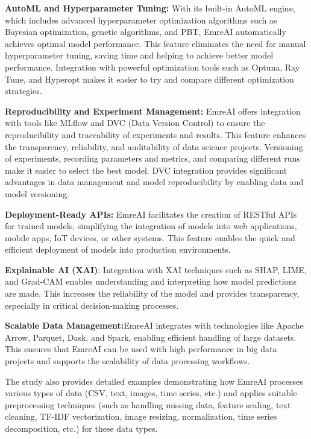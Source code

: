 \documentclass[conference]{IEEEtran}
\begin{document}
\textbf{AutoML and Hyperparameter Tuning:} With its built-in AutoML engine, which includes advanced hyperparameter optimization algorithms such as Bayesian optimization, genetic algorithms, and PBT, EmreAI automatically achieves optimal model performance. This feature eliminates the need for manual hyperparameter tuning, saving time and helping to achieve better model performance. Integration with powerful optimization tools such as Optuna, Ray Tune, and Hyperopt makes it easier to try and compare different optimization strategies.

\textbf{Reproducibility and Experiment Management:} EmreAI offers integration with tools like MLflow and DVC (Data Version Control) to ensure the reproducibility and traceability of experiments and results. This feature enhances the transparency, reliability, and auditability of data science projects. Versioning of experiments, recording parameters and metrics, and comparing different runs make it easier to select the best model. DVC integration provides significant advantages in data management and model reproducibility by enabling data and model versioning.

\textbf{Deployment-Ready APIs:} EmreAI facilitates the creation of RESTful APIs for trained models, simplifying the integration of models into web applications, mobile apps, IoT devices, or other systems. This feature enables the quick and efficient deployment of models into production environments.

\textbf{Explainable AI (XAI)}: Integration with XAI techniques such as SHAP, LIME, and Grad-CAM enables understanding and interpreting how model predictions are made. This increases the reliability of the model and provides transparency, especially in critical decision-making processes.

\textbf{Scalable Data Management:}EmreAI integrates with technologies like Apache Arrow, Parquet, Dask, and Spark, enabling efficient handling of large datasets. This ensures that EmreAI can be used with high performance in big data projects and supports the scalability of data processing workflows.

The study also provides detailed examples demonstrating how EmreAI processes various types of data (CSV, text, images, time series, etc.) and applies suitable preprocessing techniques (such as handling missing data, feature scaling, text cleaning, TF-IDF vectorization, image resizing, normalization, time series decomposition, etc.) for these data types.
\end{document}

